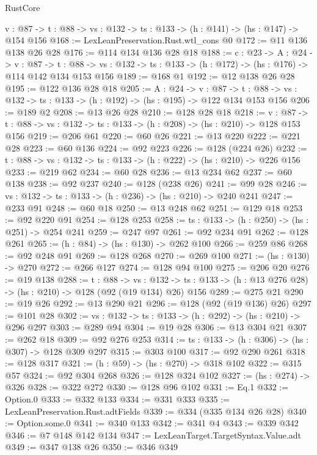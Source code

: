 \begin{lexlean}{RustCore}
\begin{coremodule}
  {v : @87} -> {t : @88} -> {vs : @132} -> {ts : @133} -> (h : @141) -> (hs : @147) -> @154 @156
@168 := LexLeanPreservation.Rust.wtl_cons @0
@172 := @11 @136 @138 @26 @28
@176 := @114 @134 @136 @28 @18
@188 := {c : @23} ->
  {A : @24} ->
  {v : @87} ->
  {t : @88} -> {vs : @132} -> {ts : @133} -> (h : @172) -> (hs : @176) -> @114 @142 @134 @153 @156
@189 := @168 @1
@192 := @12 @138 @26 @28
@195 := @122 @136 @28 @18
@205 := {A : @24} ->
  {v : @87} ->
  {t : @88} -> {vs : @132} -> {ts : @133} -> (h : @192) -> (hs : @195) -> @122 @134 @153 @156
@206 := @189 @2
@208 := @13 @26 @28
@210 := @128 @28 @18
@218 := {v : @87} ->
  {t : @88} -> {vs : @132} -> {ts : @133} -> (h : @208) -> (hs : @210) -> @128 @153 @156
@219 := @206 @61
@220 := @60 @26
@221 := @13 @220
@222 := @221 @28
@223 := @60 @136
@224 := @92 @223
@226 := @128 (@224 @26)
@232 := {t : @88} -> {vs : @132} -> {ts : @133} -> (h : @222) -> (hs : @210) -> @226 @156
@233 := @219 @62
@234 := @60 @28
@236 := @13 @234 @62
@237 := @60 @138
@238 := @92 @237
@240 := @128 (@238 @26)
@241 := @99 @28
@246 := {vs : @132} -> {ts : @133} -> (h : @236) -> (hs : @210) -> @240 @241
@247 := @233 @91
@248 := @60 @18
@250 := @13 @248 @62
@251 := @129 @18
@253 := @92 @220 @91
@254 := @128 @253
@258 := {ts : @133} -> (h : @250) -> (hs : @251) -> @254 @241
@259 := @247 @97
@261 := @92 @234 @91
@262 := @128 @261
@265 := (h : @84) -> (hs : @130) -> @262 @100
@266 := @259 @86
@268 := @92 @248 @91
@269 := @128 @268
@270 := @269 @100
@271 := (hs : @130) -> @270
@272 := @266 @127
@274 := @128 @94 @100
@275 := @206 @20
@276 := @19 @138
@288 := {t : @88} ->
  {vs : @132} -> {ts : @133} -> (h : @13 @276 @28) -> (hs : @210) -> @128 (@92 (@19 @134) @26) @156
@289 := @275 @21
@290 := @19 @26
@292 := @13 @290 @21
@296 := @128 (@92 (@19 @136) @26)
@297 := @101 @28
@302 := {vs : @132} -> {ts : @133} -> (h : @292) -> (hs : @210) -> @296 @297
@303 := @289 @94
@304 := @19 @28
@306 := @13 @304 @21
@307 := @262 @18
@309 := @92 @276 @253
@314 := {ts : @133} -> (h : @306) -> (hs : @307) -> @128 @309 @297
@315 := @303 @100
@317 := @92 @290 @261
@318 := @128 @317
@321 := (h : @59) -> (hs : @270) -> @318 @102
@322 := @315 @57
@324 := @92 @304 @268
@326 := @128 @324 @102
@327 := (hs : @274) -> @326
@328 := @322 @272
@330 := @128 @96 @102
@331 := Eq.{1}
@332 := Option.{0}
@333 := @332 @133
@334 := @331 @333
@335 := LexLeanPreservation.Rust.adtFields
@339 := @334 (@335 @134 @26 @28)
@340 := Option.some.{0}
@341 := @340 @133
@342 := @341 @4
@343 := @339 @342
@346 := @7 @148 @142 @134
@347 := LexLeanTarget.TargetSyntax.Value.adt
@349 := @347 @138 @26
@350 := @346 @349

\end{coremodule}
\end{lexlean}
